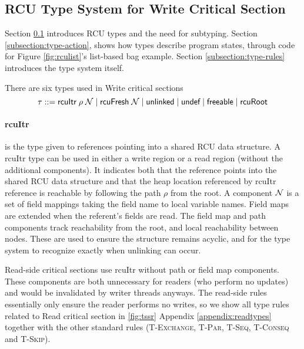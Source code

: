 \subsection{\textsf{RCU} Type System for \textsf{Write} Critical Section}
\label{subsection:rcu-typing}
Section \ref{subsection:rcu-typing} introduces \textsf{RCU} types and the need for subtyping. Section \ref{subsection:type-action}, shows how types describe program states, through code for Figure \ref{fig:rculist}'s list-based bag example. Section \ref{subsection:type-rules} introduces the type system itself.

\label{subsection:typwrt}
There are six types used in \textsf{Write} critical sections
\[
\tau ::=  \textsf{rcuItr}\;\rho\;\mathcal{N} \mid \textsf{rcuFresh}\;\mathcal{N}  \mid \textsf{unlinked} \mid \textsf{undef} \mid \textsf{freeable}
\mid \textsf{rcuRoot}\]
\paragraph{rcuItr} is the type given to references pointing into a shared RCU data structure. A \textsf{rcuItr} type can be used in either a write region or a read region (without the additional components). It indicates both that the reference points into the shared \textsf{RCU} data structure and that the heap location referenced by \textsf{rcuItr} reference is reachable by following the path $\rho$ from the root. A component $\mathcal{N}$ is a set of field mappings taking the field name to local variable names. Field maps are extended when the referent's fields are read.
The field map and path components track reachability from the root, and local reachability between nodes.  These are used to ensure the structure remains acyclic, and for the type system to recognize exactly when unlinking can occur.

Read-side critical sections use \textsf{rcuItr} without path or field map components.  These components are both unnecessary for readers (who perform no updates) and would be invalidated by writer threads anyways.
The read-side rules essentially only ensure the reader performs no writes, so
we show all type rules related to \textsf{Read} critical section in \ref{fig:tssr} Appendix \ref{appendix:readtypes} together with the other standard rules (\textsc{T-Exchange}, \textsc{T-Par}, \textsc{T-Seq}, \textsc{T-Conseq} and \textsc{T-Skip}).
